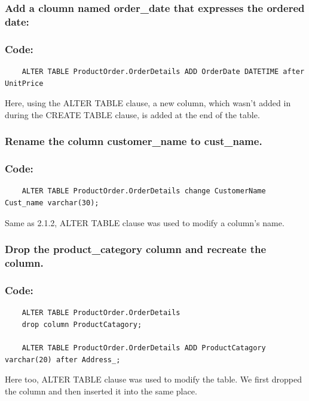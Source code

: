 \documentclass[12pt]{article}
\begin{document}
\subsubsection{Add a cloumn named order\_date that expresses the ordered date:}
\subsubsection*{Code: }
\begin{verbatim}
    ALTER TABLE ProductOrder.OrderDetails ADD OrderDate DATETIME after UnitPrice
\end{verbatim}
Here, using the ALTER TABLE clause, a new column, which wasn't added in during the CREATE TABLE clause, is added at the end of the table.

\vspace{13mm}

\subsubsection{Rename the column customer\_name to cust\_name.}
\subsubsection*{Code:}
\begin{verbatim}
    ALTER TABLE ProductOrder.OrderDetails change CustomerName Cust_name varchar(30);
\end{verbatim}
Same as 2.1.2, ALTER TABLE clause was used to modify a column's name.

\vspace{13mm}

\subsubsection{Drop the product\_category column and recreate the column.}
\subsubsection*{Code:}
\begin{verbatim}
    ALTER TABLE ProductOrder.OrderDetails
    drop column ProductCatagory;

    ALTER TABLE ProductOrder.OrderDetails ADD ProductCatagory varchar(20) after Address_;
\end{verbatim}
Here too, ALTER TABLE clause was used to modify the table. We first dropped the column and then inserted it into the same place.
\end{document}

